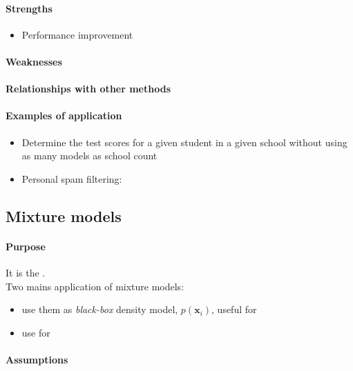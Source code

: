 \paragraph{Strengths}
\begin{itemize}
    \item Performance improvement
\end{itemize}

\paragraph{Weaknesses}
\paragraph{Relationships with other methods}
\paragraph{Examples of application}
\begin{itemize}
    \item Determine the test scores for a given student in a given school without using as many 
        models as school count
    \item Personal spam filtering: 
\end{itemize}


\subsection{Mixture models}
\paragraph{Purpose}
It is the .\\
Two mains application of mixture models:
\begin{itemize}
    \item use them as \emph{black-box} density model, $p(\bm{x}_{i})$, useful for 
    \item use for 
\end{itemize}

\paragraph{Assumptions}
